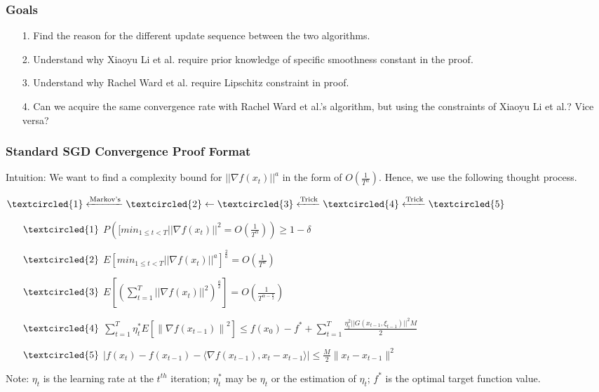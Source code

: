 \documentclass{beamer}
\begin{document}
\begin{frame}
\frametitle{Goals}
\begin{enumerate}
        \item [1.] Find the reason for the different update sequence between the two algorithms. 
        \item [2.] Understand why Xiaoyu Li et al. require prior knowledge of specific smoothness constant in the proof.
        \item [3.] Understand why Rachel Ward et al. require Lipschitz constraint in proof.
        \item [4.] Can we acquire the same convergence rate with Rachel Ward et al.'s algorithm, but using the constraints of Xiaoyu Li et al.? Vice versa?
\end{enumerate}
\end{frame}

\begin{frame}
\frametitle{Standard SGD Convergence Proof Format}
Intuition: We want to find a complexity bound for $||\nabla f(x_t)||^a$ in the form of $O(\frac{1}{T^\alpha})$. Hence, we use the following thought process.\par

$\textcircled{1} \xleftarrow{\text{Markov's}} \textcircled{2} \leftarrow \textcircled{3} \xleftarrow{\text{Trick}} \textcircled{4} \xleftarrow{\text{Trick}} \textcircled{5}$\par

\begin{enumerate}
        \item [$\textcircled{1}$] $P([min_{1 \leq t < T}||\nabla f(x_t)||^2 = O(\frac{1}{T^\alpha})) \geq 1 - \delta$
        \item [$\textcircled{2}$] $E[min_{1 \leq t < T}||\nabla f(x_t)||^a]^{\frac{2}{a}} = O(\frac{1}{T^{\alpha}})$
        
        \item [$\textcircled{3}$] $E[(\sum_{t=1}^{T}||\nabla f(x_t)||^2)^\frac{a}{2}] = O(\frac{1}{T^{\alpha - \frac{a}{2}}})$
        
        \item [$\textcircled{4}$] $ \sum_{t=1}^{T} \eta_t^* E\left[\left\|\nabla f\left(x_{t-1}\right)\right\|^2\right] \leq f\left(x_0\right)-f^*+\sum_{t=1}^{T} \frac{\eta_t^2 ||G(x_{t-1}, \xi_{t-1})||^2 M}{2}$

        \item [$\textcircled{5}$] $|f(x_t)-f(x_{t-1})-\langle\nabla f(x_{t-1}), x_t-x_{t-1}\rangle| \leq \frac{M}{2}\|x_t-x_{t-1}\|^2$
\end{enumerate} \par
Note: $\eta_t$ is the learning rate at the $t^{th}$ iteration; $\eta_t^*$ may be $\eta_t$ or the estimation of $\eta_t$; $f^*$ is the optimal target function value.
\end{frame}
\end{document}
